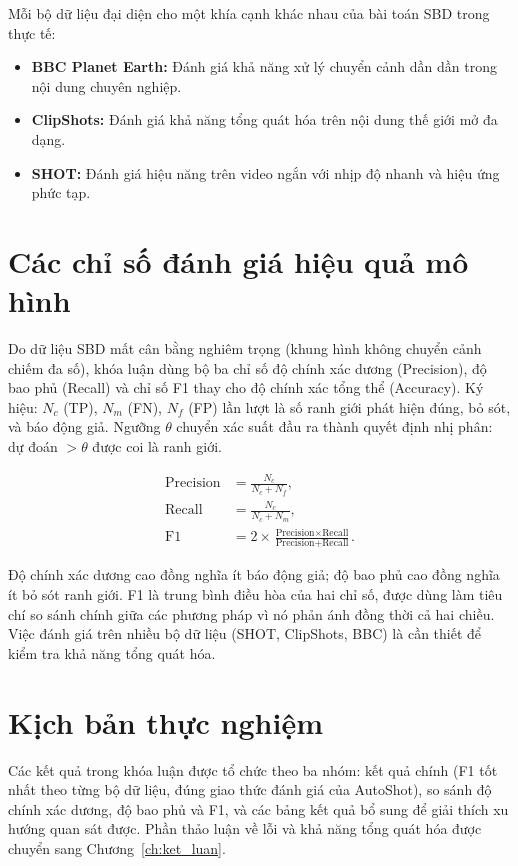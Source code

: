 Mỗi bộ dữ liệu đại diện cho một khía cạnh khác nhau của bài toán SBD trong thực tế:
\begin{itemize}
    \item \textbf{BBC Planet Earth:} Đánh giá khả năng xử lý chuyển cảnh dần dần trong nội dung chuyên nghiệp.
    \item \textbf{ClipShots:} Đánh giá khả năng tổng quát hóa trên nội dung thế giới mở đa dạng.
    \item \textbf{SHOT:} Đánh giá hiệu năng trên video ngắn với nhịp độ nhanh và hiệu ứng phức tạp.
\end{itemize}

\section{Các chỉ số đánh giá hiệu quả mô hình}
\label{sec:metrics}

Do dữ liệu SBD mất cân bằng nghiêm trọng (khung hình không chuyển cảnh chiếm đa số), khóa luận dùng bộ ba chỉ số độ chính xác dương (Precision), độ bao phủ (Recall) và chỉ số F1 thay cho độ chính xác tổng thể (Accuracy). Ký hiệu: $N_c$ (TP), $N_m$ (FN), $N_f$ (FP) lần lượt là số ranh giới phát hiện đúng, bỏ sót, và báo động giả. Ngưỡng $\theta$ chuyển xác suất đầu ra thành quyết định nhị phân: dự đoán $> \theta$ được coi là ranh giới.

\begin{align}
    \text{Precision} &= \frac{N_c}{N_c + N_f}, \\
    \text{Recall} &= \frac{N_c}{N_c + N_m}, \\
    \text{F1} &= 2 \times \frac{\text{Precision} \times \text{Recall}}{\text{Precision} + \text{Recall}}.
\end{align}

Độ chính xác dương cao đồng nghĩa ít báo động giả; độ bao phủ cao đồng nghĩa ít bỏ sót ranh giới. F1 là trung bình điều hòa của hai chỉ số, được dùng làm tiêu chí so sánh chính giữa các phương pháp vì nó phản ánh đồng thời cả hai chiều. Việc đánh giá trên nhiều bộ dữ liệu (SHOT, ClipShots, BBC) là cần thiết để kiểm tra khả năng tổng quát hóa.

\section{Kịch bản thực nghiệm}
\label{sec:experimental_scenarios}
Các kết quả trong khóa luận được tổ chức theo ba nhóm: kết quả chính (F1 tốt nhất theo từng bộ dữ liệu, đúng giao thức đánh giá của AutoShot), so sánh độ chính xác dương, độ bao phủ và F1, và các bảng kết quả bổ sung để giải thích xu hướng quan sát được. Phần thảo luận về lỗi và khả năng tổng quát hóa được chuyển sang Chương~\ref{ch:ket_luan}.

